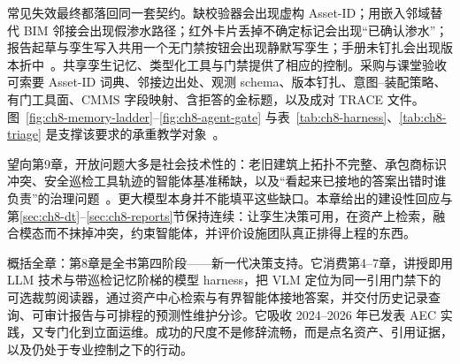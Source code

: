 常见失效最终都落回同一套契约。缺校验器会出现虚构 Asset-ID；用嵌入邻域替代 BIM 邻接会出现假渗水路径；红外卡片丢掉不确定标记会出现``已确认渗水''；报告起草与孪生写入共用一个无门禁按钮会出现静默写孪生；手册未钉扎会出现版本折中~\cite{ji2023,peng2024,lee2024ragsafety,luo2025llmdtrobot}。共享孪生记忆、类型化工具与门禁提供了相应的控制。采购与课堂验收可索要 Asset-ID 词典、邻接边出处、观测 schema、版本钉扎、意图--装配策略、有门工具面、CMMS 字段映射、含拒答的金标题，以及成对 TRACE 文件。图~\ref{fig:ch8-memory-ladder}--\ref{fig:ch8-agent-gate} 与表~\ref{tab:ch8-harness}、\ref{tab:ch8-triage} 是支撑该要求的承重教学对象~\cite{yao2023react,hellin2025bimmas,buga2025llmfmsql}。

望向第9章，开放问题大多是社会技术性的：老旧建筑上拓扑不完整、承包商标识冲突、安全巡检工具轨迹的智能体基准稀缺，以及``看起来已接地的答案出错时谁负责''的治理问题~\cite{saka2024gptconstruction,ma2026tenquestions}。更大模型本身并不能填平这些缺口。本章给出的建设性回应与第\ref{sec:ch8-dt}--\ref{sec:ch8-reports}节保持连续：让孪生决策可用，在资产上检索，融合模态而不抹掉冲突，约束智能体，并评价设施团队真正排得上程的东西。

概括全章：第8章是全书第四阶段——新一代决策支持。它消费第4--7章，讲授即用 LLM 技术与带巡检记忆阶梯的模型 harness，把 VLM 定位为同一引用门禁下的可选裁剪阅读器，通过资产中心检索与有界智能体接地答案，并交付历史记录查询、可审计报告与可排程的预测性维护分诊。它吸收 2024--2026 年已发表 AEC 实践，又专门化到立面运维。成功的尺度不是修辞流畅，而是点名资产、引用证据，以及仍处于专业控制之下的行动。
